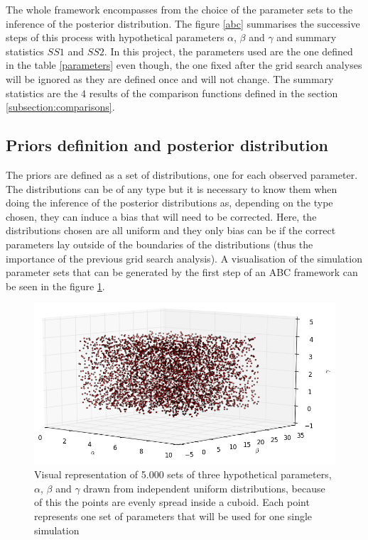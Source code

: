 \documentclass[a4paper,12pt]{report}
\begin{document}
The whole framework encompasses from the choice of the parameter sets to the inference of the posterior distribution. The figure \ref{abc} summarises the successive steps of this process with hypothetical parameters $\alpha$, $\beta$ and $\gamma$ and summary statistics $SS1$ and $SS2$. In this project, the parameters used are the one defined in the table \ref{parameters} even though, the one fixed after the grid search analyses will be ignored as they are defined once and will not change. The summary statistics are the 4 results of the comparison functions defined in the section \ref{subsection:comparisons}.

\subsection{Priors definition and posterior distribution}
The priors are defined as a set of distributions, one for each observed parameter. The distributions can be of any type but it is necessary to know them when doing the inference of the posterior distributions as, depending on the type chosen, they can induce a bias that will need to be corrected. Here, the distributions chosen are all uniform and they only bias can be if the correct parameters lay outside of the boundaries of the distributions (thus the importance of the previous grid search analysis). A visualisation of the simulation parameter sets that can be generated by the first step of an ABC framework can be seen in the figure \ref{abc-space}.

\begin{figure}[ht]
	\centering
	\includegraphics[scale=0.5]{../data/abc-space.png}
	\caption{Visual representation of 5.000 sets of three hypothetical parameters, $\alpha$, $\beta$ and $\gamma$ drawn from independent uniform distributions, because of this the points are evenly spread inside a cuboid. Each point represents one set of parameters that will be used for one single simulation}
	\label{abc-space}
\end{figure}
\end{document}

